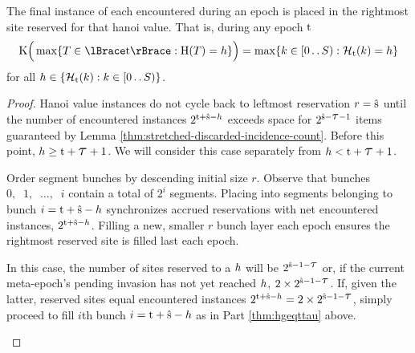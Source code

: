\begin{lemma}
\label{thm:tilted-last-touched}
The final instance of each \hv{} encountered during an epoch is placed in the rightmost site reserved for that hanoi value.
That is, during any epoch $\colort$
\begin{align*}
\colorK\Big(
  \max\{\colorT \in \colortsetofT : \colorH(\colorT) = \colorh\}
\Big)
=
\max\{\colork \in [0\twodots\colorS) : \colorHcal_{\colort}(\colork) = \colorh \}
\end{align*}
for all $\colorh \in \{\colorHcal_{\colort}(\colork) : \colork \in [0\twodots\colorS)\}$.
\end{lemma}

\begin{proof}
Hanoi value instances do not cycle back to leftmost reservation $r=\colors$ until the number of encountered \hv{} instances $2^{\colort + \colors - \colorh}$ exceeds space for $2^{\colors - \colortau - 1}$ items guaranteed by Lemma \ref{thm:stretched-discarded-incidence-count}.
Before this point, $\colorh \geq \colort + \colortau + 1$.
We will consider this case separately from $\colorh < \colort + \colortau + 1$.

\begin{proofpart}
\label{thm:hgeqttau}
Order segment bunches by descending initial size $r$.
Observe that bunches $0,\;\;1,\;\;\ldots,\;\;i$ contain a total of $2^i$ segments.
Placing into segments belonging to bunch $i = \colort + \colors - \colorh$ synchronizes accrued reservations with net encountered \hv{} instances, $2^{\colort + \colors - \colorh}$.
Filling a new, smaller $r$ bunch layer each epoch ensures the rightmost reserved site is filled last each epoch.
\end{proofpart}

\begin{proofpart}
In this case, the number of sites reserved to a \hv{} $\colorh$ will be $2^{\colors - 1 - \colortau}$ or, if the current meta-epoch's pending invasion has not yet reached \hv{} $\colorh$, $2 \times 2^{\colors - 1 - \colortau}$.
If, given the latter, reserved sites equal encountered \hv{} instances $2^{\colort + \colors - \colorh} = 2 \times 2^{\colors - 1 - \colortau}$, simply proceed to fill $i$th bunch $i=\colort + \colors - \colorh$ as in Part \ref{thm:hgeqttau} above.


\end{proofpart}
\end{proof}
